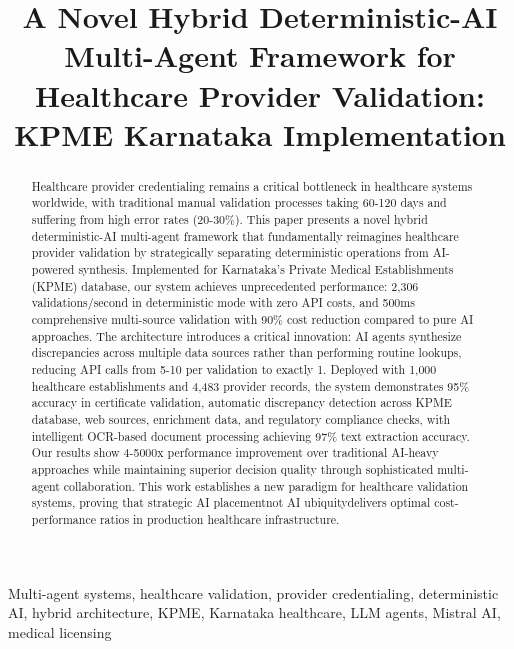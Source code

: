 \documentclass[conference]{IEEEtran}
\begin{document}
\title{A Novel Hybrid Deterministic-AI Multi-Agent Framework for Healthcare Provider Validation: KPME Karnataka Implementation}

\author{
}

\maketitle

\begin{abstract}
Healthcare provider credentialing remains a critical bottleneck in healthcare systems worldwide, with traditional manual validation processes taking 60-120 days and suffering from high error rates (20-30\%). This paper presents a novel hybrid deterministic-AI multi-agent framework that fundamentally reimagines healthcare provider validation by strategically separating deterministic operations from AI-powered synthesis. Implemented for Karnataka's Private Medical Establishments (KPME) database, our system achieves unprecedented performance: 2,306 validations/second in deterministic mode with zero API costs, and 500ms comprehensive multi-source validation with 90\% cost reduction compared to pure AI approaches. The architecture introduces a critical innovation: AI agents synthesize discrepancies across multiple data sources rather than performing routine lookups, reducing API calls from 5-10 per validation to exactly 1. Deployed with 1,000 healthcare establishments and 4,483 provider records, the system demonstrates 95\% accuracy in certificate validation, automatic discrepancy detection across KPME database, web sources, enrichment data, and regulatory compliance checks, with intelligent OCR-based document processing achieving 97\% text extraction accuracy. Our results show 4-5000x performance improvement over traditional AI-heavy approaches while maintaining superior decision quality through sophisticated multi-agent collaboration. This work establishes a new paradigm for healthcare validation systems, proving that strategic AI placementnot AI ubiquitydelivers optimal cost-performance ratios in production healthcare infrastructure.
\end{abstract}

\begin{IEEEkeywords}
Multi-agent systems, healthcare validation, provider credentialing, deterministic AI, hybrid architecture, KPME, Karnataka healthcare, LLM agents, Mistral AI, medical licensing
\end{IEEEkeywords}
\end{document}
